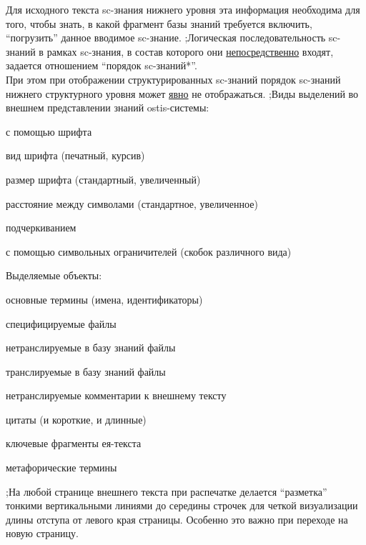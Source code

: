 \begin{SCn}
{Для исходного текста sc-знания нижнего уровня эта информация необходима для того, чтобы знать, в какой фрагмент базы знаний требуется включить, ``погрузить'' данное вводимое sc-знание.
;Логическая последовательность sc-знаний в рамках sc-знания, в состав которого они \uline{непосредственно} входят, задается отношением ``порядок sc-знаний*''.\\
При этом при отображении структурированных sc-знаний порядок sc-знаний нижнего структурного уровня может \uline{явно} не отображаться.
;Виды выделений во внешнем представлении знаний ostis-системы:
\begin{scnitemize}
    \item с помощью шрифта
    \begin{scnitemizeii}
        \item вид шрифта (печатный, курсив)
        \item размер шрифта (стандартный, увеличенный)
        \item расстояние между символами (стандартное, увеличенное)
    \end{scnitemizeii}
    \item подчеркиванием
    \item с помощью символьных ограничителей (скобок различного вида)
\end{scnitemize}
Выделяемые объекты:
\begin{scnitemize}
    \item основные термины (имена, идентификаторы)
    \item специфицируемые файлы
    \begin{scnitemizeii}
        \item нетранслируемые в базу знаний файлы
        \item транслируемые в базу знаний файлы
    \end{scnitemizeii}
    \item нетранслируемые комментарии к внешнему тексту
    \item цитаты (и короткие, и длинные)
    \item ключевые фрагменты ея-текста
    \item метафорические термины
\end{scnitemize}
;На любой странице внешнего текста при распечатке делается ``разметка'' тонкими вертикальными линиями до середины строчек для четкой визуализации длины отступа от левого края страницы. Особенно это важно при переходе на новую страницу.}  
\filemodefalse


\end{SCn}
